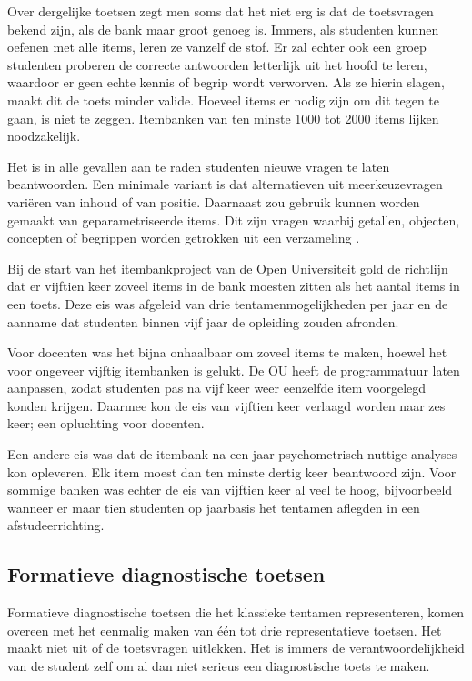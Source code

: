 \documentclass[
]{book}
\begin{document}
Over dergelijke toetsen zegt men soms dat het niet erg is dat de toetsvragen bekend zijn, als de bank maar groot genoeg is. Immers, als studenten kunnen oefenen met alle items, leren ze vanzelf de stof. Er zal echter ook een groep studenten proberen de correcte antwoorden letterlijk uit het hoofd te leren, waardoor er geen echte kennis of begrip wordt verworven. Als ze hierin slagen, maakt dit de toets minder valide. Hoeveel items er nodig zijn om dit tegen te gaan, is niet te zeggen. Itembanken van ten minste 1000 tot 2000 items lijken noodzakelijk.

Het is in alle gevallen aan te raden studenten nieuwe vragen te laten beantwoorden. Een minimale variant is dat alternatieven uit meerkeuzevragen variëren van inhoud of van positie. Daarnaast zou gebruik kunnen worden gemaakt van geparametriseerde items. Dit zijn vragen waarbij getallen, objecten, concepten of begrippen worden getrokken uit een verzameling \citep{fattoh2014automatic}.

Bij de start van het itembankproject van de Open Universiteit gold de richtlijn dat er vijftien keer zoveel items in de bank moesten zitten als het aantal items in een toets. Deze eis was afgeleid van drie tentamenmogelijkheden per jaar en de aanname dat studenten binnen vijf jaar de opleiding zouden afronden.

Voor docenten was het bijna onhaalbaar om zoveel items te maken, hoewel het voor ongeveer vijftig itembanken is gelukt. De OU heeft de programmatuur laten aanpassen, zodat studenten pas na vijf keer weer eenzelfde item voorgelegd konden krijgen. Daarmee kon de eis van vijftien keer verlaagd worden naar zes keer; een opluchting voor docenten.

Een andere eis was dat de itembank na een jaar psychometrisch nuttige analyses kon opleveren. Elk item moest dan ten minste dertig keer beantwoord zijn. Voor sommige banken was echter de eis van vijftien keer al veel te hoog, bijvoorbeeld wanneer er maar tien studenten op jaarbasis het tentamen aflegden in een afstudeerrichting.

\hypertarget{formatieve-diagnostische-toetsen}{%
\subsection{Formatieve diagnostische toetsen}\label{formatieve-diagnostische-toetsen}}

Formatieve diagnostische toetsen die het klassieke tentamen representeren, komen overeen met het eenmalig maken van één tot drie representatieve toetsen. Het maakt niet uit of de toetsvragen uitlekken. Het is immers de verantwoordelijkheid van de student zelf om al dan niet serieus een diagnostische toets te maken.
\end{document}
